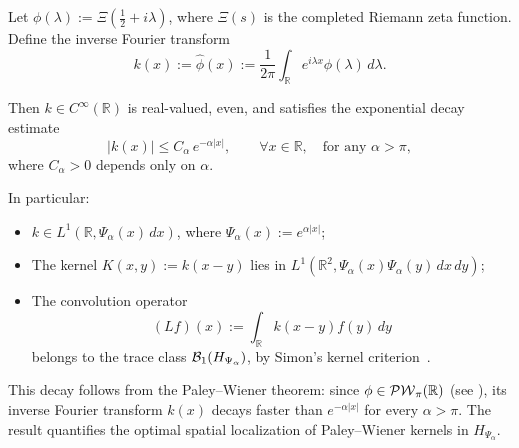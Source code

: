 \begin{lemma}
\label{lem:decay_inverse_fourier_xi}
Let \( \phi(\lambda) := \Xi\left( \tfrac{1}{2} + i\lambda \right) \), where \( \Xi(s) \) is the completed Riemann zeta function. Define the inverse Fourier transform
\[
k(x) := \widehat{\phi}(x) := \frac{1}{2\pi} \int_{\mathbb{R}} e^{i\lambda x} \phi(\lambda)\, d\lambda.
\]

Then \( k \in C^\infty(\mathbb{R}) \) is real-valued, even, and satisfies the exponential decay estimate
\[
|k(x)| \le C_\alpha\, e^{-\alpha |x|}, \qquad \forall x \in \mathbb{R}, \quad \text{for any } \alpha > \pi,
\]
where \( C_\alpha > 0 \) depends only on \( \alpha \).

\medskip
\noindent In particular:
\begin{itemize}
  \item \( k \in L^1(\mathbb{R}, \Psi_\alpha(x)\, dx) \), where \( \Psi_\alpha(x) := e^{\alpha |x|} \);
  \item The kernel \( K(x,y) := k(x - y) \) lies in \( L^1(\mathbb{R}^2, \Psi_\alpha(x)\Psi_\alpha(y)\, dx\, dy) \);
  \item The convolution operator
  \[
  (L f)(x) := \int_{\mathbb{R}} k(x - y) f(y)\, dy
  \]
  belongs to the trace class \( \mathcal{B}_1(H_{\Psi_\alpha}) \), by Simon’s kernel criterion~\cite[Thm.~4.2]{Simon2005TraceIdeals}.
\end{itemize}

\medskip
\noindent
This decay follows from the Paley--Wiener theorem: since \( \phi \in \mathcal{PW}_{\pi}(\mathbb{R}) \) (see ), its inverse Fourier transform \( k(x) \) decays faster than \( e^{-\alpha |x|} \) for every \( \alpha > \pi \). The result quantifies the optimal spatial localization of Paley--Wiener kernels in \( H_{\Psi_\alpha} \).
\end{lemma}
